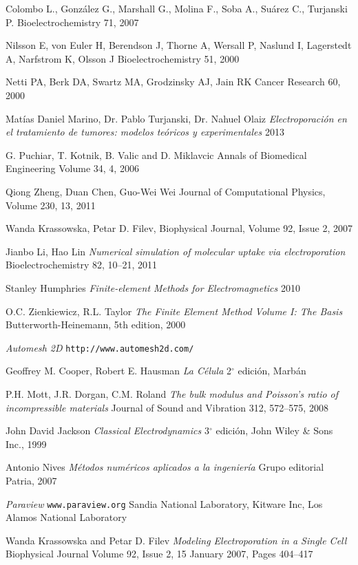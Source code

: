 \backmatter


\begin{thebibliography}{99}


	Colombo L., González G., Marshall G., Molina F., Soba A., Suárez C., Turjanski P.
	Bioelectrochemistry 71,
	2007

	Nilsson E, von Euler H, Berendson J, Thorne A, Wersall P, Naslund I, Lagerstedt A, Narfstrom K, Olsson J
	Bioelectrochemistry 51,
	2000

	Netti PA, Berk DA, Swartz MA, Grodzinsky AJ, Jain RK
	Cancer Research 60,
	2000

	Matías Daniel Marino, Dr. Pablo Turjanski, Dr. Nahuel Olaiz
	\emph{Electroporación en el tratamiento de tumores: modelos teóricos y experimentales}
	2013

	G. Puchiar, T. Kotnik, B. Valic and D. Miklavcic
	Annals of Biomedical Engineering
	Volume 34, 4, 2006

	Qiong Zheng, Duan Chen, Guo-Wei Wei
	Journal of Computational Physics,	
	Volume 230, 13, 2011

	Wanda Krassowska, Petar D. Filev,
	Biophysical Journal, Volume 92, Issue 2, 2007

	Jianbo Li, Hao Lin
	\emph{Numerical simulation of molecular uptake via electroporation}
	Bioelectrochemistry 82, 10–21, 2011 

	Stanley Humphries
	\emph{Finite-element Methods for Electromagnetics}
	2010

	O.C. Zienkiewicz, R.L. Taylor
	\emph{The Finite Element Method Volume I: The Basis}
	Butterworth-Heinemann, 5th edition, 2000

	\emph{Automesh 2D}
	\texttt{http://www.automesh2d.com/}

	Geoffrey M. Cooper, Robert E. Hausman
	\emph{La Célula}
	2$^{\circ}$ edición, 
	Marbán

	P.H. Mott, J.R. Dorgan, C.M. Roland 
	\emph{The bulk modulus and Poisson's ratio of incompressible materials} 
	Journal of Sound and Vibration 312, 572–575, 2008
	
	John David Jackson
	\emph{Classical Electrodynamics}
	3$^{\circ}$ edición,
	John Wiley \& Sons Inc.,
	1999

	Antonio Nives
	\emph{Métodos numéricos aplicados a la ingeniería}
	Grupo editorial Patria,
	2007

	\emph{Paraview}
	\texttt{www.paraview.org}
	Sandia National Laboratory, Kitware Inc, Los Alamos National Laboratory

	Wanda Krassowska and Petar D. Filev
	\emph{Modeling Electroporation in a Single Cell}
	Biophysical Journal
	Volume 92, Issue 2, 15 January 2007, Pages 404–417


\end{thebibliography}
